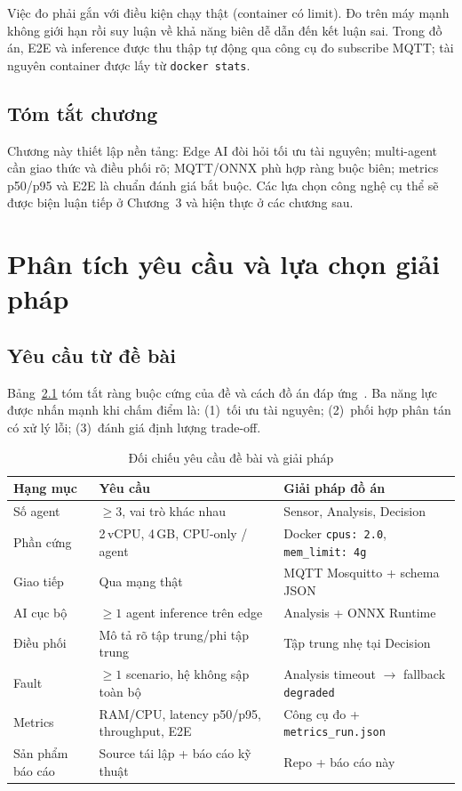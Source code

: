 \documentclass[12pt,a4paper,oneside]{report}
\newcommand{\code}[1]{\texttt{#1}}
\begin{document}
Việc đo phải gắn với điều kiện chạy thật (container có limit). Đo trên máy mạnh không giới hạn rồi suy luận về khả năng biên dễ dẫn đến kết luận sai. Trong đồ án, E2E và inference được thu thập tự động qua công cụ đo subscribe MQTT; tài nguyên container được lấy từ \code{docker stats}.

\section{Tóm tắt chương}

Chương này thiết lập nền tảng: Edge AI đòi hỏi tối ưu tài nguyên; multi-agent cần giao thức và điều phối rõ; MQTT/ONNX phù hợp ràng buộc biên; metrics p50/p95 và E2E là chuẩn đánh giá bắt buộc. Các lựa chọn công nghệ cụ thể sẽ được biện luận tiếp ở Chương~3 và hiện thực ở các chương sau.

\chapter{Phân tích yêu cầu và lựa chọn giải pháp}

\section{Yêu cầu từ đề bài}

Bảng~\ref{tab:yeu-cau-de} tóm tắt ràng buộc cứng của đề và cách đồ án đáp ứng~\cite{ce2206-de}. Ba năng lực được nhấn mạnh khi chấm điểm là: (1)~tối ưu tài nguyên; (2)~phối hợp phân tán có xử lý lỗi; (3)~đánh giá định lượng trade-off.

\begin{table}[htbp]
  \centering
  \caption{Đối chiếu yêu cầu đề bài và giải pháp}
  \label{tab:yeu-cau-de}
  \begin{tabular}{p{2.3cm}p{5.0cm}p{5.5cm}}
    \toprule
    \textbf{Hạng mục} & \textbf{Yêu cầu} & \textbf{Giải pháp đồ án} \\
    \midrule
    Số agent & $\geq 3$, vai trò khác nhau & Sensor, Analysis, Decision \\
    Phần cứng & 2\,vCPU, 4\,GB, CPU-only / agent & Docker \code{cpus: 2.0}, \code{mem\_limit: 4g} \\
    Giao tiếp & Qua mạng thật & MQTT Mosquitto + schema JSON \\
    AI cục bộ & $\geq 1$ agent inference trên edge & Analysis + ONNX Runtime \\
    Điều phối & Mô tả rõ tập trung/phi tập trung & Tập trung nhẹ tại Decision \\
    Fault & $\geq 1$ scenario, hệ không sập toàn bộ & Analysis timeout $\rightarrow$ fallback \code{degraded} \\
    Metrics & RAM/CPU, latency p50/p95, throughput, E2E & Công cụ đo + \code{metrics\_run.json} \\
    Sản phẩm báo cáo & Source tái lập + báo cáo kỹ thuật & Repo + báo cáo này \\
    \bottomrule
  \end{tabular}
\end{table}
\end{document}
